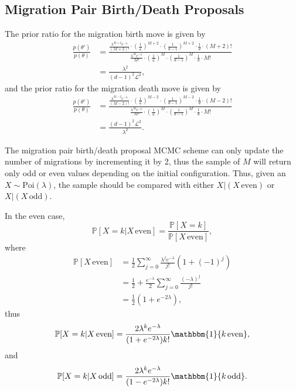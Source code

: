 \documentclass[12pt,a4paper]{article}
\newcommand{\calL}{\mathcal{L}}
\newcommand{\bbP}{\mathbb{P}}
\begin{document}
			\subsection{Migration Pair Birth/Death Proposals}
				The prior ratio for the migration birth move is given by
					\begin{align*}
						\frac{p(\theta')}{p(\theta)} & = \frac{\frac{\lambda^{M+2} e^{-\lambda}}{(M+2)!} \cdot \left( \frac{1}{\calL} \right)^{M+2} \cdot \left( \frac{1}{d-1} \right)^{M+2} \cdot \frac{1}{d} \cdot (M+2)!}{\frac{\lambda^M e^{-\lambda}}{M!} \cdot \left( \frac{1}{\calL} \right)^M \cdot \left( \frac{1}{d-1} \right)^M \cdot \frac{1}{d} \cdot M!} \\
						& = \frac{\lambda^2}{(d-1)^2 \calL^2 },
					\end{align*}
				and the prior ratio for the migration death move is given by
					\begin{align*}
						\frac{p(\theta')}{p(\theta)} & = \frac{\frac{\lambda^{M -2 } e^{-\lambda}}{(M-2)!} \cdot \left( \frac{1}{\calL} \right)^{M - 2} \cdot \left( \frac{1}{d-1} \right)^{M-2} \cdot \frac{1}{d} \cdot (M-2)!}{\frac{\lambda^M e^{-\lambda}}{M!} \cdot \left( \frac{1}{\calL} \right)^M \cdot \left( \frac{1}{d-1} \right)^M \cdot \frac{1}{d} \cdot M!} \\
						& = \frac{(d-1)^2 \calL^2 }{\lambda^2}.
					\end{align*}
				
				The migration pair birth/death proposal MCMC scheme can only update the number of migrations by incrementing it by 2, thus the sample of $M$ will return only odd or even values depending on the initial configuration. Thus, given an $X \sim \text{Poi}(\lambda)$, the sample should be compared with either $X | (X \, \text{even})$ or $X | (X \, \text{odd} )$.
				
				In the even case,
					\[
						\bbP [X = k | X \, \text{even}] = \frac{\bbP[X = k]}{\bbP[X \, \text{even}]},
					\]
				where
					\begin{align*}
						\bbP[X \, \text{even}] & = \frac{1}{2} \sum_{j=0}^\infty \frac{\lambda^{j} e^{-\lambda}}{j!} (1 + (-1)^j) \\
							& = \frac{1}{2} + \frac{e^{-\lambda}}{2} \sum_{j=0}^\infty \frac{(-\lambda)^j}{j!} \\
							& = \frac{1}{2}(1 + e^{-2 \lambda}),
					\end{align*}
				thus
					\[
						\bbP [X = k | X \, \text{even}] = \frac{2\lambda^k e^{-\lambda}}{(1 + e^{-2 \lambda}) k!} \mathbbm{1} \{k \, \text{even} \},
					\]
				and
					\[
					\bbP [X = k | X \, \text{odd}] = \frac{2\lambda^k e^{-\lambda}}{(1 - e^{-2 \lambda}) k!} \mathbbm{1} \{k \, \text{odd} \}.
					\]
					
\end{document}

